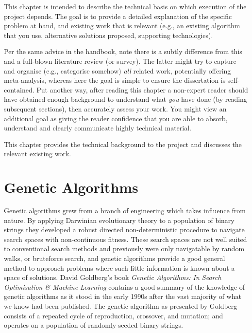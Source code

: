 {
	\color{red}
\noindent
This chapter is intended to describe the technical basis on which execution
of the project depends.  The goal is to provide a detailed explanation of
the specific problem at hand, and existing work that is relevant (e.g., an
existing algorithm that you use, alternative solutions proposed, supporting
technologies).

Per the same advice in the handbook, note there is a subtly difference from
this and a full-blown literature review (or survey).  The latter might try
to capture and organise (e.g., categorise somehow) {\em all} related work,
potentially offering meta-analysis, whereas here the goal is simple to
ensure the dissertation is self-contained.  Put another way, after reading
this chapter a non-expert reader should have obtained enough background to
understand what {\em you} have done (by reading subsequent sections), then
accurately assess your work.  You might view an additional goal as giving
the reader confidence that you are able to absorb, understand and clearly
communicate highly technical material.
}

This chapter provides the technical background to the project and discusses
the relevant existing work.

\section{Genetic Algorithms}
Genetic algorithms grew from a branch of engineering which takes influence from
nature. By applying Darwinian evolutionary theory to a population of binary strings
they developed
a robust directed non-deterministic procedure to navigate search spaces with non-continuous
fitness. These search spaces are not well suited to conventional search methods
and previously were only navigatable by random walks, or bruteforce search,
and genetic algorithms provide a good general method to approach problems where
such little information is known about a space of solutions.
David Goldberg's book {\em Genetic Algorithms: In Search Optimisation \& Machine
Learning} \cite{Goldberg:1989:GAS:534133} contains a good summary of the knowledge
of genetic algorithms as it stood in the early 1990s after the vast majority of what
we know had been published.
The genetic algorithm as presented by Goldberg consists
of a repeated cycle of reproduction, crossover, and mutation; and operates on a
population of randomly seeded binary strings.

